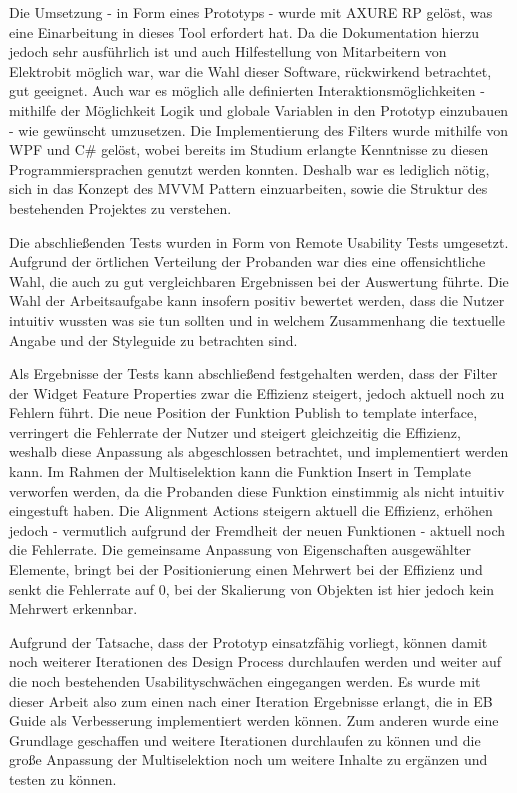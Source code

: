 Die Umsetzung - in Form eines Prototyps - wurde mit AXURE RP gelöst, was eine Einarbeitung in dieses Tool erfordert hat.
Da die Dokumentation hierzu jedoch sehr ausführlich ist und auch Hilfestellung von Mitarbeitern von Elektrobit möglich war, war die Wahl dieser Software, rückwirkend betrachtet, gut geeignet.
Auch war es möglich alle definierten Interaktionsmöglichkeiten -mithilfe der Möglichkeit Logik und globale Variablen in den Prototyp einzubauen - wie gewünscht umzusetzen.
Die Implementierung des Filters wurde mithilfe von WPF und C\# gelöst, wobei bereits im Studium erlangte Kenntnisse zu diesen Programmiersprachen genutzt werden konnten.
Deshalb war es lediglich nötig, sich in das Konzept des MVVM Pattern einzuarbeiten, sowie die Struktur des bestehenden Projektes zu verstehen.

Die abschließenden Tests wurden in Form von Remote Usability Tests umgesetzt.
Aufgrund der örtlichen Verteilung der Probanden war dies eine offensichtliche Wahl, die auch zu gut vergleichbaren Ergebnissen bei der Auswertung führte.
Die Wahl der Arbeitsaufgabe kann insofern positiv bewertet werden, dass die Nutzer intuitiv wussten was sie tun sollten und in welchem Zusammenhang die textuelle Angabe und der Styleguide zu betrachten sind.

Als Ergebnisse der Tests kann abschließend festgehalten werden, dass der Filter der Widget Feature Properties zwar die Effizienz steigert, jedoch aktuell noch zu Fehlern führt.
Die neue Position der Funktion \glqq Publish to template interface\grqq{}, verringert die Fehlerrate der Nutzer und steigert gleichzeitig die Effizienz, weshalb diese Anpassung als abgeschlossen betrachtet, und implementiert werden kann.
Im Rahmen der Multiselektion kann die Funktion \glqq Insert in Template\grqq{} verworfen werden, da die Probanden diese Funktion einstimmig als nicht intuitiv eingestuft haben.
Die \glqq Alignment Actions\grqq{} steigern aktuell die Effizienz, erhöhen jedoch - vermutlich aufgrund der Fremdheit der neuen Funktionen - aktuell noch die Fehlerrate.
Die gemeinsame Anpassung von Eigenschaften ausgewählter Elemente, bringt bei der Positionierung einen Mehrwert bei der Effizienz und senkt die Fehlerrate auf 0, bei der Skalierung von Objekten ist hier jedoch kein Mehrwert erkennbar.

Aufgrund der Tatsache, dass der Prototyp einsatzfähig vorliegt, können damit noch weiterer Iterationen des Design Process durchlaufen werden und weiter auf die noch bestehenden Usabilityschwächen eingegangen werden.
Es wurde mit dieser Arbeit also zum einen nach einer Iteration Ergebnisse erlangt, die in EB Guide als Verbesserung implementiert werden können.
Zum anderen wurde eine Grundlage geschaffen und weitere Iterationen durchlaufen zu können und die große Anpassung der Multiselektion noch um weitere Inhalte zu ergänzen und testen zu können.
